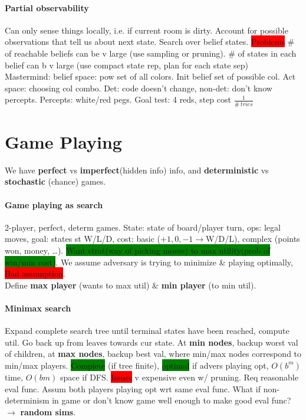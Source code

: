 \paragraph{Partial observability} Can only sense things locally,
i.e. if current room is dirty. Account for possible observations that
tell us about next state. Search over belief
states. \colorbox{red}{Problems} \# of reachable beliefs can be v
large (use sampling or pruning). \# of states in each belief can b
v large (use compact state rep, plan for each state sep)
\\ Mastermind: belief space: pow set of all colors. Init belief set of
possible col. Act space: choosing col combo. Det: code doesn't change,
non-det: don't know percepts. Percepts: white/red pegs. Goal test: 4
reds, step cost $\frac{1}{\# \ tries}$
\color[HTML]{8A2BE2}
\section{Game Playing} We have \textbf{perfect} vs
\textbf{imperfect}(hidden info) info, and \textbf{deterministic} vs
\textbf{stochastic} (chance) games.
\paragraph{Game playing as search} 2-player, perfect, determ
games. State: state of board/player turn, ops: legal moves, goal:
states st W/L/D, cost: basic ($+1, 0, -1 \to $W/D/L), complex (points
won, money, \ldots). \colorbox{green}{Want strat(way of picking moves)
  to max utility(prob of win/min cost)}. We assume adversary is trying
to minimize \& playing optimally, \colorbox{red}{Bad assumption}.
\\ Define \textbf{max player} (wants to max util) \& \textbf{min
  player} (to min util).
\paragraph{Minimax search} Expand complete search tree until terminal
states have been reached, compute util. Go back up from leaves towards
cur state. At \textbf{min nodes}, backup worst val of children, at \textbf{max nodes},
backup best val, where min/max nodes correspond to min/max
players. \colorbox{green}{Complete} (if tree finite),
\colorbox{green}{optimal} if advers playing opt, $O(b^m)$ time,
$O(bm)$ space if DFS. \colorbox{red}{Issues} v expensive even w/
pruning. Req reasonable eval func. Assum both players playing
opt wrt same eval func. What if non-determinism in game or don't know
game well enough to make good eval func? $\to$ \textbf{random sims}.
